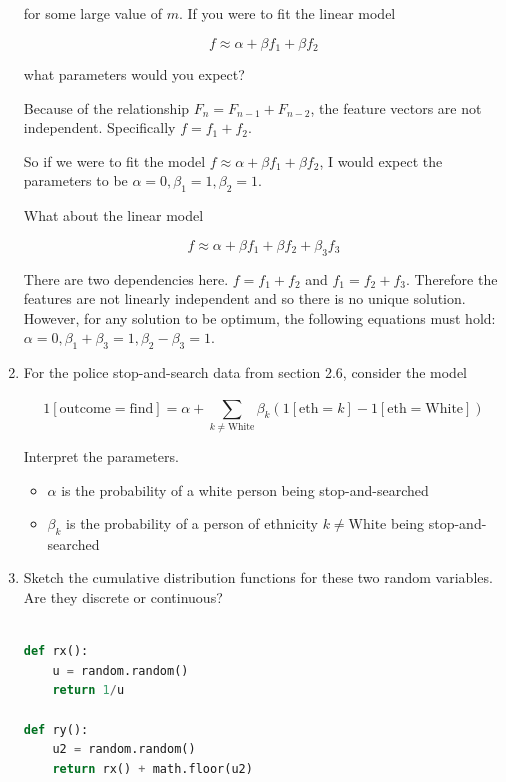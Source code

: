 \documentclass[10pt,\jkfside,a4paper]{article}
\begin{document}
\begin{enumerate}[label=\arabic*]
for some large value of $m$. If you were to fit the linear model

\[
f \approx \alpha + \beta f_1 + \beta f_2
\]

what parameters would you expect?

Because of the relationship $F_n = F_{n-1} + F_{n-2}$, the feature vectors
are not independent. Specifically $f = f_1 + f_2$.

So if we were to fit the model $f \approx \alpha + \beta f_1 + \beta f_2$, I
would expect the parameters to be $\alpha=0, \beta_1=1, \beta_2=1$.

What about the linear model

\[
f \approx \alpha + \beta f_1 + \beta f_2 + \beta_3 f_3
\]

There are two dependencies here. $f = f_1 + f_2$ and $f_1 = f_2 + f_3$.
Therefore the features are not linearly independent and so there is no
unique solution. However, for any solution to be optimum, the following
equations must hold: $\alpha = 0, \beta_1 + \beta_3 = 1, \beta_2 - \beta_3
= 1$.

\item For the police stop-and-search data from section 2.6, consider the model

\[
1[\text{outcome}=\text{find}] = \alpha + \sum^{}_{k\neq\text{White}} \beta_k
(1[\text{eth}=k] - 1[\text{eth}=\text{White}])
\]

Interpret the parameters.

\begin{itemize}

\item $\alpha$ is the probability of a white person being stop-and-searched

\item $\beta_k$ is the probability of a person of ethnicity
$k\neq\text{White}$ being stop-and-searched

\end{itemize}

\item Sketch the cumulative distribution functions for these two random
variables. Are they discrete or continuous?

\begin{lstlisting}[language=Python]

def rx():
	u = random.random()
	return 1/u

def ry():
	u2 = random.random()
	return rx() + math.floor(u2)

\end{lstlisting}


\end{enumerate}
\end{document}
